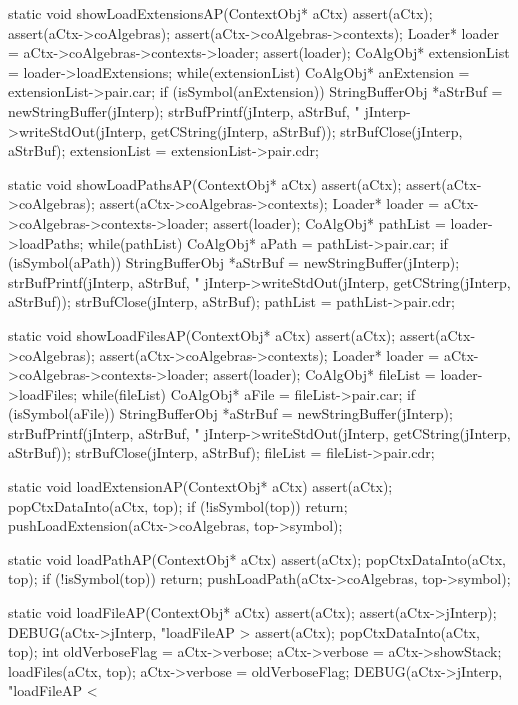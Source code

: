 \starttyping
static void showLoadExtensionsAP(ContextObj* aCtx) {
  assert(aCtx);
  assert(aCtx->coAlgebras);
  assert(aCtx->coAlgebras->contexts);
  Loader* loader = aCtx->coAlgebras->contexts->loader;
  assert(loader);
  CoAlgObj* extensionList = loader->loadExtensions;
  while(extensionList) {
    CoAlgObj* anExtension = extensionList->pair.car;
    if (isSymbol(anExtension)) {
      StringBufferObj *aStrBuf =
        newStringBuffer(jInterp);
      strBufPrintf(jInterp, aStrBuf, "%
      jInterp->writeStdOut(jInterp, getCString(jInterp, aStrBuf));
      strBufClose(jInterp, aStrBuf);
    }
    extensionList = extensionList->pair.cdr;
  }
}

static void showLoadPathsAP(ContextObj* aCtx) {
  assert(aCtx);
  assert(aCtx->coAlgebras);
  assert(aCtx->coAlgebras->contexts);
  Loader* loader = aCtx->coAlgebras->contexts->loader;
  assert(loader);
  CoAlgObj* pathList = loader->loadPaths;
  while(pathList) {
    CoAlgObj* aPath = pathList->pair.car;
    if (isSymbol(aPath)) {
      StringBufferObj *aStrBuf =
        newStringBuffer(jInterp);
      strBufPrintf(jInterp, aStrBuf, "%
      jInterp->writeStdOut(jInterp, getCString(jInterp, aStrBuf));
      strBufClose(jInterp, aStrBuf);
    }
    pathList = pathList->pair.cdr;
  }
}

static void showLoadFilesAP(ContextObj* aCtx) {
  assert(aCtx);
  assert(aCtx->coAlgebras);
  assert(aCtx->coAlgebras->contexts);
  Loader* loader = aCtx->coAlgebras->contexts->loader;
  assert(loader);
  CoAlgObj* fileList = loader->loadFiles;
  while(fileList) {
    CoAlgObj* aFile = fileList->pair.car;
    if (isSymbol(aFile)) {
      StringBufferObj *aStrBuf =
        newStringBuffer(jInterp);
      strBufPrintf(jInterp, aStrBuf, "%
      jInterp->writeStdOut(jInterp, getCString(jInterp, aStrBuf));
      strBufClose(jInterp, aStrBuf);
    }
    fileList = fileList->pair.cdr;
  }
}

static void loadExtensionAP(ContextObj* aCtx) {
  assert(aCtx);
  popCtxDataInto(aCtx, top);
  if (!isSymbol(top)) return;
  pushLoadExtension(aCtx->coAlgebras, top->symbol);
}

static void loadPathAP(ContextObj* aCtx) {
  assert(aCtx);
  popCtxDataInto(aCtx, top);
  if (!isSymbol(top)) return;
  pushLoadPath(aCtx->coAlgebras, top->symbol);
}

static void loadFileAP(ContextObj* aCtx) {
  assert(aCtx);
  assert(aCtx->jInterp);
  DEBUG(aCtx->jInterp, "loadFileAP > %
  assert(aCtx);
  popCtxDataInto(aCtx, top);
  int oldVerboseFlag = aCtx->verbose;
  aCtx->verbose = aCtx->showStack;
  loadFiles(aCtx, top);
  aCtx->verbose = oldVerboseFlag;
  DEBUG(aCtx->jInterp, "loadFileAP < %
}

